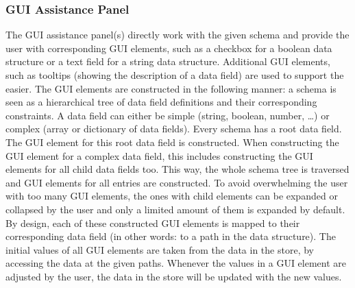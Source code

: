 
\subsubsection{GUI Assistance Panel}
The GUI assistance panel(s) directly work with the given schema and provide the user with corresponding GUI elements, such as a checkbox for a boolean data structure or a text field for a string data structure.
Additional GUI elements, such as tooltips (showing the description of a data field) are used to support the easier.
The GUI elements are constructed in the following manner: a schema is seen as a hierarchical tree of data field definitions and their corresponding constraints.
A data field can either be simple (string, boolean, number, \ldots) or complex (array or dictionary of data fields).
Every schema has a root data field.
The GUI element for this root data field is constructed. %
When constructing the GUI element for a complex data field, this includes constructing the GUI elements for all child data fields too.
This way, the whole schema tree is traversed and GUI elements for all entries are constructed.
To avoid overwhelming the user with too many GUI elements, the ones with child elements can be expanded or collapsed by the user and only a limited amount of them is expanded by default.
By design, each of these constructed GUI elements is mapped to their corresponding data field (in other words: to a path in the data structure).
The initial values of all GUI elements are taken from the data in the store, by accessing the data at the given paths.
Whenever the values in a GUI element are adjusted by the user, the data in the store will be updated with the new values.


%
